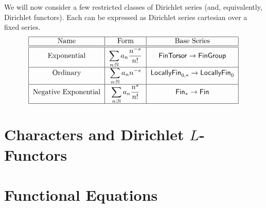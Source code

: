 We will now consider a few restricted classes of Dirichlet series (and,
equivalently, Dirichlet functors). Each can be expressed as Dirichlet series
cartesian over a fixed series.
\[
  \begin{tabular}{|c|c|c|}
    \hline
    Name & Form & Base Series \\\hline\hline
    Exponential & $\displaystyle \sum_{n : \Nb} a_n\frac{n^{-s}}{n!}$ & $\type{FinTorsor} \to \type{FinGroup}$ \\ \hline
    Ordinary & $\displaystyle \sum_{n : \Nb} a_n n^{-s} $ & $\type{LocallyFin}_{0,\ast} \to \type{LocallyFin}_0$ \\ \hline
    Negative Exponential & $\displaystyle \sum_{n : \Nb} a_n \frac{n^s}{n!}$ & $\type{Fin}_{\ast} \to \type{Fin}$\\ \hline
  \end{tabular}
\]





\section{Characters and Dirichlet $L$-Functors}


\section{Functional Equations}

